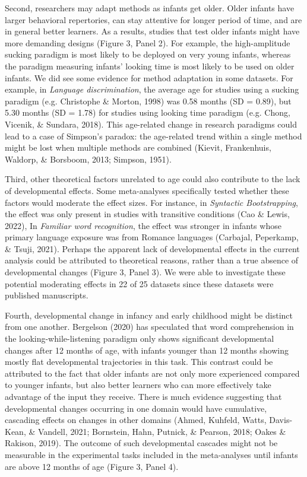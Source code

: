 \documentclass[
  man]{apa6}
\begin{document}
Second, researchers may adapt methods as infants get older. Older infants have larger behavioral repertories, can stay attentive for longer period of time, and are in general better learners. As a results, studies that test older infants might have more demanding designs (Figure 3, Panel 2). For example, the high-amplitude sucking paradigm is most likely to be deployed on very young infants, whereas the paradigm measuring infants' looking time is most likely to be used on older infants. We did see some evidence for method adaptation in some datasets. For example, in \emph{Language discrimination}, the average age for studies using a sucking paradigm (e.g. Christophe \& Morton, 1998) was 0.58 months (SD = 0.89), but 5.30 months (SD = 1.78) for studies using looking time paradigm (e.g. Chong, Vicenik, \& Sundara, 2018). This age-related change in research paradigms could lead to a case of Simpson's paradox: the age-related trend within a single method might be lost when multiple methods are combined (Kievit, Frankenhuis, Waldorp, \& Borsboom, 2013; Simpson, 1951).

Third, other theoretical factors unrelated to age could also contribute to the lack of developmental effects. Some meta-analyses specifically tested whether these factors would moderate the effect sizes. For instance, in \emph{Syntactic Bootstrapping}, the effect was only present in studies with transitive conditions (Cao \& Lewis, 2022), In \emph{Familiar word recognition}, the effect was stronger in infants whose primary language exposure was from Romance languages (Carbajal, Peperkamp, \& Tsuji, 2021). Perhaps the apparent lack of developmental effects in the current analysis could be attributed to theoretical reasons, rather than a true absence of developmental changes (Figure 3, Panel 3). We were able to investigate these potential moderating effects in 22 of 25 datasets since these datasets were published manuscripts.

Fourth, developmental change in infancy and early childhood might be distinct from one another. Bergelson (2020) has speculated that word comprehension in the looking-while-listening paradigm only shows significant developmental changes after 12 months of age, with infants younger than 12 months showing mostly flat developmental trajectories in this task. This contrast could be attributed to the fact that older infants are not only more experienced compared to younger infants, but also better learners who can more effectively take advantage of the input they receive. There is much evidence suggesting that developmental changes occurring in one domain would have cumulative, cascading effects on changes in other domains (Ahmed, Kuhfeld, Watts, Davis-Kean, \& Vandell, 2021; Bornstein, Hahn, Putnick, \& Pearson, 2018; Oakes \& Rakison, 2019). The outcome of such developmental cascades might not be measurable in the experimental tasks included in the meta-analyses until infants are above 12 months of age (Figure 3, Panel 4).
\end{document}
